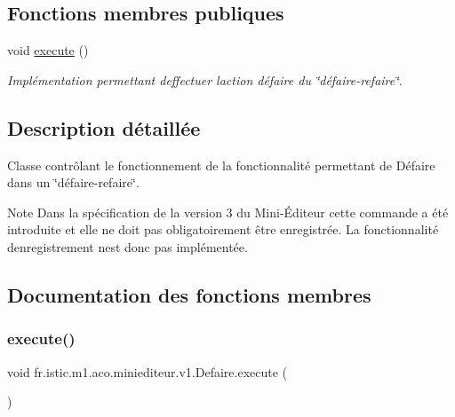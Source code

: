 \subsection*{Fonctions membres publiques}
\begin{DoxyCompactItemize}
\item 
void \hyperlink{classfr_1_1istic_1_1m1_1_1aco_1_1miniediteur_1_1v1_1_1Defaire_a3b8c0beab28336ae060284fdf4a78a52}{execute} ()
\begin{DoxyCompactList}\small\item\em Implémentation permettant d\textquotesingle{}effectuer l\textquotesingle{}action défaire du \char`\"{}défaire-\/refaire\char`\"{}. \end{DoxyCompactList}\end{DoxyCompactItemize}


\subsection{Description détaillée}
Classe contrôlant le fonctionnement de la fonctionnalité permettant de Défaire dans un \char`\"{}défaire-\/refaire\char`\"{}. 

\begin{DoxyNote}{Note}
Dans la spécification de la version 3 du Mini-\/Éditeur cette commande a été introduite et elle ne doit pas obligatoirement être enregistrée. La fonctionnalité d\textquotesingle{}enregistrement n\textquotesingle{}est donc pas implémentée. 
\end{DoxyNote}


\subsection{Documentation des fonctions membres}
\mbox{\label{classfr_1_1istic_1_1m1_1_1aco_1_1miniediteur_1_1v1_1_1Defaire_a3b8c0beab28336ae060284fdf4a78a52}} 
\subsubsection{\texorpdfstring{execute()}{execute()}}
{\footnotesize\ttfamily void fr.\+istic.\+m1.\+aco.\+miniediteur.\+v1.\+Defaire.\+execute (\begin{DoxyParamCaption}{ }\end{DoxyParamCaption})}



